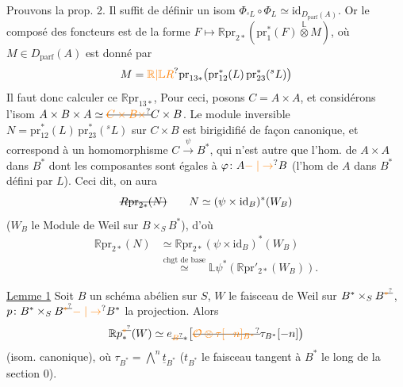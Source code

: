 Prouvons la prop. 2. Il suffit de définir un isom $\Phi_{{}^{s}L}\circ\Phi_L\simeq \mathrm{id}_{D_{\mathrm{parf}}(A)}$. Or le composé des foncteurs est de la forme $F\longmapsto \mathbb{R} \mathrm{pr}_{2*}(\mathrm{pr}_1^*(F)\overset{\mathbb L}{\otimes} M)$, où $M\in D_{\mathrm{parf}}(A)$ est donné par
\[
M=\unsure{\mathbb{R}|\mathbb L R}\mathrm{pr}_{13*}\bigl(\mathrm{pr}_{12}^*(L)\,\mathrm{pr}_{23}^*({}^{s}L)\bigr)
\]
Il faut donc calculer ce $\mathbb{R} \mathrm{pr}_{13*}$,  Pour ceci, posons $C=A\times A$, et considérons l'isom $A\times B\times A\simeq\deleted{\unsure{C\times B\times}}C\times B$. Le module inversible $N=\mathrm{pr}_{12}^*(L)\,\mathrm{pr}_{23}^*({}^{s}L)$ sur $C\times B$ est  birigidifié de façon canonique, et correspond à un homomorphisme $C\xrightarrow{\psi}B^*$, qui n'est autre que l'hom. de $A\times A$ dans $B^*$ dont les  composantes sont égales à $\varphi\colon A\unsure{\mathrel{-}|\to}B$ (l'hom de $A$ dans $B^*$ défini par $L$).
Ceci dit, on aura
\[
\deleted{R \mathrm{pr}_{2*}(N)}\qquad N\simeq(\psi\times \mathrm{id}_B)^*(W_B)
\]
($W_B$ le Module de Weil sur $B\times_S B^*$), d'où
\[
\begin{aligned}
\mathbb{R} \mathrm{pr}_{2*}(N)&\simeq \mathbb{R} \mathrm{pr}_{2*}(\psi\times \mathrm{id}_B)^*(W_B)\\
&\overset{\text{chgt de base}}{\simeq}\mathbb{L}\psi^*(\mathbb{R} \mathrm{pr}'_{2*}(W_B)).
\end{aligned}
\]

\uline{Lemme 1} Soit $B$ un schéma abélien sur $S$, $W$ le faisceau de Weil sur $B^*\times_S B^{\deleted{\unsure{*}}}$, $p\colon B^*\times_S B^{\deleted{\unsure{*}}}\unsure{\mathrel{-}|\to}B^*$ la projection. Alors
\[
\mathbb{R} p^{\deleted{\unsure{*}}}_*(W)\simeq e_{\deleted{\unsure{B}}*}\bigl[\deleted{\unsure{\mathcal{O}\otimes\tau[-n]_{B^*}}}\tau_{B^*}[-n]\bigr)
\]
(isom. canonique), où $\tau_{B^*}=\bigwedge^n\underline{t}_{B^*}$ ($t_{B^*}$ le faisceau tangent à $B^*$ le long de la section $0$).

